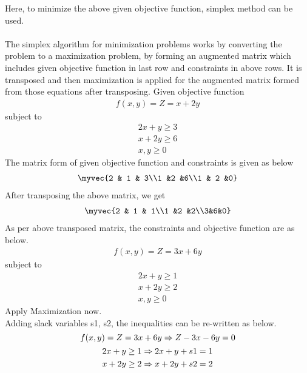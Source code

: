 Here, to minimize the above given objective function, simplex method can be used.\\
\\
The simplex algorithm for minimization problems works by converting the problem to a maximization problem, by forming an augmented matrix which includes given objective function in last row and constraints in above rows. It is transposed and then maximization is applied for the augmented matrix formed from those equations after transposing.
Given objective function
\begin{align}
f(x,y) = Z = x+2y
\end{align}
subject to\\
\begin{align}
2x+y\geq 3\\
x+2y\geq 6\\
x,y\geq 0
\end{align}
The matrix form of given objective function and constraints is given as below
\begin{align}
\myvec{2 & 1 & 3\\1 &2 &6\\1 & 2 &0}
\end{align}
After transposing the above matrix, we get
\begin{align}
\myvec{2 & 1 & 1\\1 &2 &2\\3&6&0}
\end{align} 
As per above transposed matrix, the constraints and objective function are as below.
\begin{align}
f(x,y) = Z = 3x+6y
\end{align}
subject to\\
\begin{align}
2x+y\geq 1\\
x+2y\geq 2\\
x,y\geq 0
\end{align}
Apply Maximization now.\\
Adding slack variables s1, s2, the inequalities can be re-written as below.
\begin{equation}
f(x,y) = Z = 3x+6y\Rightarrow Z-3x-6y=0\\
\end{equation}
\begin{equation}
2x+y\geq 1\Rightarrow 2x+y+s1=1\\
\end{equation}
\begin{equation}
x+2y\geq 2\Rightarrow x+2y+s2=2\\
\end{equation}

